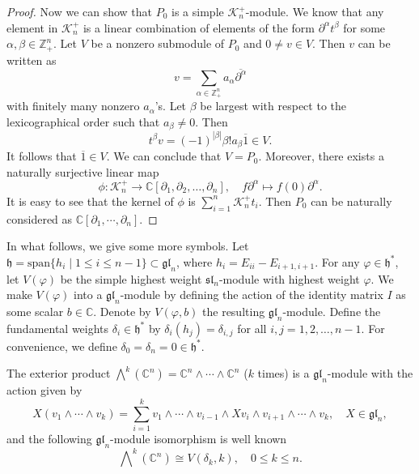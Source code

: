 \documentclass[12pt, a4paper]{amsart}
\newcommand{\C}{\mathbb{C}}
\def\gl{\mathfrak{gl}}
\theoremstyle{Theorem}
\theoremstyle{Theorem}
\numberwithin{equation}{section}
\begin{document}
\begin{proof}
	Now we can show that $P_0$ is a simple  $\mathcal{K}_n^+$-module. We know that any element in $\mathcal{K}_n^+$ is a linear combination of elements of the form $\partial^\alpha t^\beta$ for some $\alpha, \beta\in {\mathbb Z}_+^n$.
Let $V$ be a nonzero submodule of $P_0$ and $0\neq v\in V$. Then $v$ can be written as
	\begin{equation*}
	v=\sum_{\alpha\in\mathbb{Z}_+^n}a_{\alpha}\overline{\partial^{\alpha}}
	\end{equation*}
	with finitely many nonzero $a_{\alpha}$'s. Let $\beta$ be largest
with respect to the lexicographical order
such that $a_{\beta}\neq 0$. Then
	\begin{equation*}
		t^{\beta}v=(-1)^{|\beta|}\beta!a_{\beta}\overline{1}\in V.
	\end{equation*}
	It follows that $\overline{1}\in V$. We can conclude that $V=P_0$.
Moreover, there exists a naturally surjective linear map
	$$\phi: \mathcal{K}_n^+ \rightarrow \mathbb{C}[\partial_{1},\partial_{2},
\ldots,\partial_{n}],\quad f\partial^{\alpha} \mapsto f(0)\partial^{\alpha}.$$
	It is easy to see that the kernel of $\phi$ is $\sum\limits_{i=1}^{n}\mathcal{K}_n^+t_i$.
Then $P_0$ can be naturally considered as $\C[\partial_1,\cdots,\partial_n]$.
\end{proof}
In what follows, we give some more symbols.
Let $\mathfrak{h}=\text{span}\{h_i\mid1\leq i\leq n-1\}\subset \gl_{n}$, where $h_i=E_{ii}-E_{i+1,i+1}$.
For any $\varphi\in\mathfrak{h}^*$, let $V(\varphi)$ be the
simple highest weight $\mathfrak{sl}_n$-module with highest weight $\varphi$.
We make $V(\varphi)$ into a $\mathfrak{gl}_n$-module by defining the action of
the identity matrix $I$ as some scalar $b \in \mathbb{C}$.
Denote by $V(\varphi, b)$ the resulting $\mathfrak{gl}_n$-module.
Define the fundamental weights $\delta_{i}\in\mathfrak{h}^*$ by $\delta_{i}(h_j)=\delta_{i,j}$
for all $i,j=1,2,\dots,n-1$. For convenience, we define $\delta_{0}=\delta_{n}=0\in\mathfrak{h}^*$.

The exterior product $\bigwedge^k(\mathbb{C}^n)=\mathbb{C}^n\wedge\cdots\wedge\mathbb{C}^n$ ($k$ times)
is a $\mathfrak{gl}_n$-module with the action given by
\[X(v_1\wedge\cdots\wedge v_k)=\sum_{i=1}^k v_1\wedge\cdots\wedge v_{i-1}\wedge X v_i\wedge
v_{i+1}\wedge\cdots\wedge v_k,\quad X\in\mathfrak{gl}_n,\]
and the following $\mathfrak{gl}_n$-module isomorphism is well known
\begin{equation}\label{Impo-Isomorphism}
\bigwedge\nolimits^{k}(\mathbb{C}^n)\cong V(\delta_{k},k),\quad 0\leq k\leq n.
\end{equation}
\end{document}
